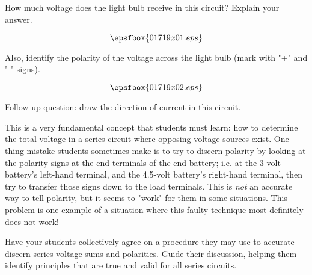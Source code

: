 

How much voltage does the light bulb receive in this circuit?  Explain your answer.

$$\epsfbox{01719x01.eps}$$

Also, identify the polarity of the voltage across the light bulb (mark with "+" and "-" signs).







$$\epsfbox{01719x02.eps}$$

\vskip 10pt

Follow-up question: draw the direction of current in this circuit.







This is a very fundamental concept that students must learn: how to determine the total voltage in a series circuit where opposing voltage sources exist.  One thing mistake students sometimes make is to try to discern polarity by looking at the polarity signs at the end terminals of the end battery; i.e. at the 3-volt battery's left-hand terminal, and the 4.5-volt battery's right-hand terminal, then try to transfer those signs down to the load terminals.  This is {\it not} an accurate way to tell polarity, but it seems to "work" for them in some situations.  This problem is one example of a situation where this faulty technique most definitely does not work!

Have your students collectively agree on a procedure they may use to accurate discern series voltage sums and polarities.  Guide their discussion, helping them identify principles that are true and valid for all series circuits.




